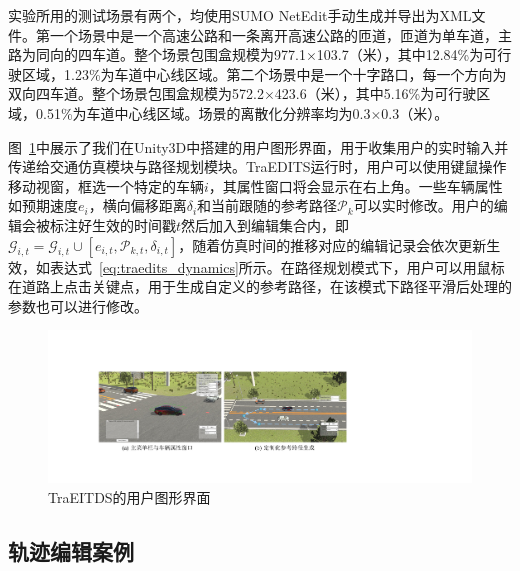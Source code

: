 实验所用的测试场景有两个，均使用SUMO NetEdit手动生成并导出为XML文件。第一个场景中是一个高速公路和一条离开高速公路的匝道，匝道为单车道，主路为同向的四车道。整个场景包围盒规模为977.1$\times$103.7（米），其中12.84\%为可行驶区域，1.23\%为车道中心线区域。第二个场景中是一个十字路口，每一个方向为双向四车道。整个场景包围盒规模为572.2$\times$423.6（米），其中5.16\%为可行驶区域，0.51\%为车道中心线区域。场景的离散化分辨率均为0.3$\times$0.3（米）。

图~\ref{fig:traedits_gui}中展示了我们在Unity3D中搭建的用户图形界面，用于收集用户的实时输入并传递给交通仿真模块与路径规划模块。TraEDITS运行时，用户可以使用键鼠操作移动视窗，框选一个特定的车辆$i$，其属性窗口将会显示在右上角。一些车辆属性如预期速度$e_{i}$，横向偏移距离$\delta_{i}$和当前跟随的参考路径$\mathscr{P}_{k}$可以实时修改。用户的编辑会被标注好生效的时间戳$t$然后加入到编辑集合内，即$\mathcal{G}_{i,t} = \mathcal{G}_{i,t} \cup [e_{i,t}, \mathscr{P}_{k,t}, \delta_{i,t}]$，随着仿真时间的推移对应的编辑记录会依次更新生效，如表达式~\ref{eq:traedits_dynamics}所示。在路径规划模式下，用户可以用鼠标在道路上点击关键点，用于生成自定义的参考路径，在该模式下路径平滑后处理的参数也可以进行修改。


\begin{figure}[!tbh]
\centering
\centering
\includegraphics[width=\columnwidth]{figure/traedits/GUI v2.pdf}
\caption[TraEITDS的用户图形界面]{
TraEITDS的用户图形界面
}
\label{fig:traedits_gui}
\end{figure}



\subsection{轨迹编辑案例}
\label{section:traedits_cases}

